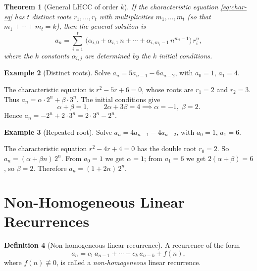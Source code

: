 \documentclass[12pt,a4paper,openany]{book}
\theoremstyle{definition}
\newtheorem{definition}{Definition}[chapter]
\newtheorem{example}[definition]{Example}
\theoremstyle{plain}
\newtheorem{theorem}[definition]{Theorem}
\theoremstyle{remark}
\begin{document}
\begin{theorem}[General LHCC of order $k$]\label{thm:LHCC-general}
If the characteristic equation \eqref{eq:char-eq} has $t$ distinct roots
$r_1, \dots, r_t$ with multiplicities $m_1, \dots, m_t$ (so that
$m_1 + \cdots + m_t = k$), then the general solution is
\[
   a_n = \sum_{i=1}^{t}\,
         \bigl(\alpha_{i,0} + \alpha_{i,1}\, n + \cdots
               + \alpha_{i,m_i - 1}\, n^{m_i - 1}\bigr)\, r_i^n,
\]
where the $k$ constants $\alpha_{i,j}$ are determined by the $k$ initial
conditions.
\end{theorem}

\begin{example}[Distinct roots]\label{ex:distinct-roots}
Solve $a_n = 5a_{n-1} - 6a_{n-2}$, with $a_0 = 1$, $a_1 = 4$.

The characteristic equation is $r^2 - 5r + 6 = 0$, whose roots are
$r_1 = 2$ and $r_2 = 3$.  Thus $a_n = \alpha \cdot 2^n + \beta \cdot 3^n$.
The initial conditions give
\[
   \alpha + \beta = 1, \qquad 2\alpha + 3\beta = 4
   \implies \alpha = -1,\; \beta = 2.
\]
Hence $a_n = -2^n + 2 \cdot 3^n = 2 \cdot 3^n - 2^n$.
\end{example}

\begin{example}[Repeated root]\label{ex:repeated-root}
Solve $a_n = 4a_{n-1} - 4a_{n-2}$, with $a_0 = 1$, $a_1 = 6$.

The characteristic equation $r^2 - 4r + 4 = 0$ has the double root
$r_0 = 2$.  So $a_n = (\alpha + \beta n)\, 2^n$.  From $a_0 = 1$ we get
$\alpha = 1$; from $a_1 = 6$ we get $2(\alpha + \beta) = 6$, so
$\beta = 2$.  Therefore $a_n = (1 + 2n)\, 2^n$.
\end{example}

\section{Non-Homogeneous Linear Recurrences}\label{sec:rec-nonhomogeneous}

\begin{definition}[Non-homogeneous linear recurrence]\label{def:nonhom}
A recurrence of the form
\[
   a_n = c_1\, a_{n-1} + \cdots + c_k\, a_{n-k} + f(n),
\]
where $f(n) \not\equiv 0$, is called a \emph{non-homogeneous} linear
recurrence.
\end{definition}
\end{document}
